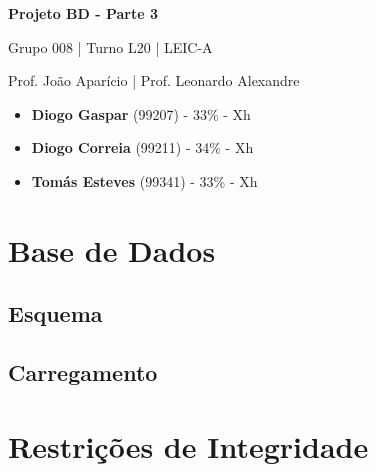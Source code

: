\documentclass[12pt,a4paper]{article}
\begin{document}
  \begin{titlepage}
    \begin{center}
      \vspace*{5cm}

      \Huge
      \textbf{Projeto BD - Parte 3}

      \vspace{0.5cm}
      \LARGE
      Grupo 008 | Turno L20 | LEIC-A

      \vspace{0.5cm}
      \large
      Prof. João Aparício | Prof. Leonardo Alexandre

      \vfill
    \end{center}
    \large
    \begin{itemize}
      \item[] \textbf{Diogo Gaspar} (99207) - 33\% - Xh
      \item[] \textbf{Diogo Correia} (99211) - 34\% - Xh
      \item[] \textbf{Tomás Esteves} (99341) - 33\% - Xh
    \end{itemize}
  \end{titlepage}

  \section*{Base de Dados}

  \subsection*{Esquema}


  
  
  \subsection*{Carregamento}


  \section*{Restrições de Integridade}
\end{document}
